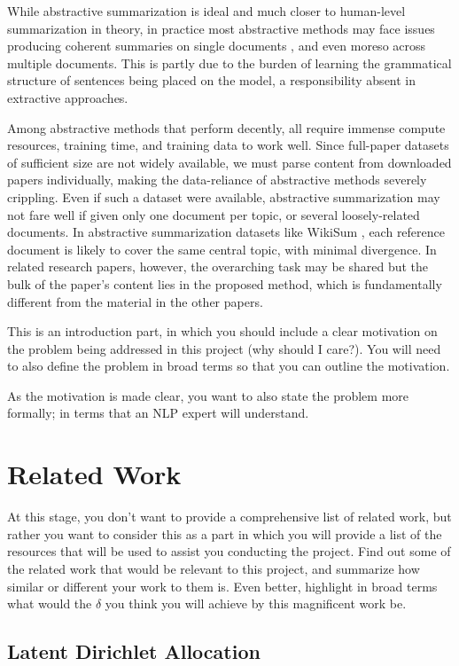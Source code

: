 \documentclass[conference]{sig-alternate-05-2015}
\begin{document}
While abstractive summarization is ideal and much closer to human-level summarization in theory, in practice most 
abstractive methods may face issues producing coherent summaries on single documents \cite{mds2017}, and even moreso 
across multiple documents. This is partly due to the burden of learning the grammatical structure of sentences being 
placed on the model, a responsibility absent in extractive approaches. 

Among abstractive methods that perform decently, all require 
immense compute resources, training time, and training data to work well. Since full-paper datasets of sufficient size are not 
widely available, we must parse content from downloaded papers individually, making the data-reliance of abstractive 
methods severely crippling. Even if such a dataset were available, abstractive summarization may not fare well if given 
only one document per topic, or several loosely-related documents. In abstractive summarization datasets like WikiSum \cite{wikisum}, 
each reference document is likely to cover the same central topic, with minimal divergence. In related research papers, however, the overarching task 
may be shared but the bulk of the paper's content lies in the proposed method, which is fundamentally different from the 
material in the other papers.

This is an introduction part, in which you should include a clear motivation on the problem being addressed in this project (why should I care?). You will need to also define the problem in broad terms so that you can outline the motivation. 

As the motivation is made clear, you want to also state the problem more formally; in terms that an NLP expert will understand. 


\section{Related Work}\label{sec:related}
At this stage, you don't want to provide a comprehensive list of related work, but rather you want to consider this as a part in which you will provide a list of the resources that will be used to assist you conducting the project. Find out some of the related work that would be relevant to this project, and summarize how similar or different your work to them is. Even better, highlight in broad terms what would the $\delta$ you think you will achieve by this magnificent work be. 

\subsection{Latent Dirichlet Allocation}
\end{document}

